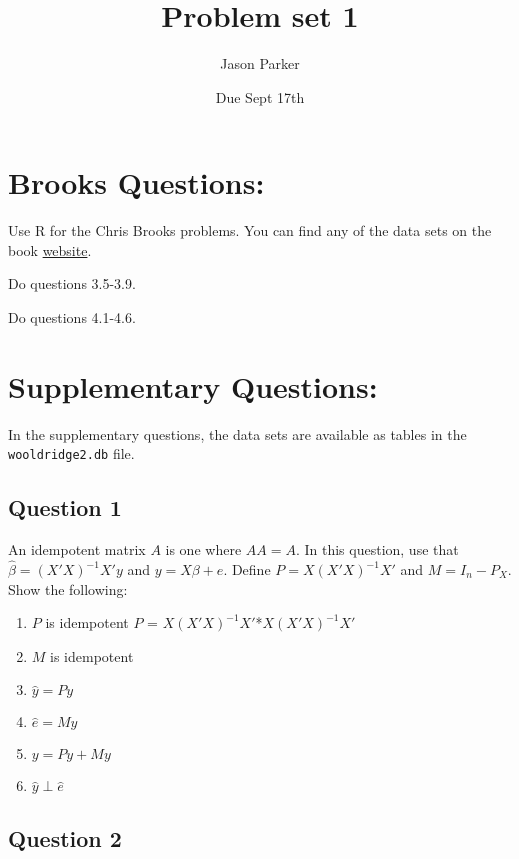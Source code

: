 \documentclass[]{article}
\title{Problem set 1}
\author{Jason Parker}
\date{Due Sept 17th}
\providecommand{\tightlist}{%
  \setlength{\itemsep}{0pt}\setlength{\parskip}{0pt}}
\begin{document}
\maketitle

\section{Brooks Questions:}\label{brooks-questions}

Use R for the Chris Brooks problems. You can find any of the data sets
on the book
\href{https://www.cambridge.org/us/academic/subjects/economics/finance/introductory-econometrics-finance-4th-edition}{website}.

Do questions 3.5-3.9.

Do questions 4.1-4.6.

\section{Supplementary Questions:}\label{supplementary-questions}

In the supplementary questions, the data sets are available as tables in
the \texttt{wooldridge2.db} file.

\subsection{Question 1}\label{question-1}

An idempotent matrix \(A\) is one where \(AA=A\). In this question, use
that \(\hat\beta=(X'X)^{-1}X'y\) and \(y=X\beta+e\). Define
\(P=X(X'X)^{-1}X'\) and \(M=I_n-P_X\). Show the following:

\begin{enumerate}
\def\labelenumi{\roman{enumi}.}
\tightlist
\item
  \(P\) is idempotent \(P\) = \(X(X'X)^{-1}X'\)*\(X(X'X)^{-1}X'\)
\item
  \(M\) is idempotent
\item
  \(\hat{y}=P y\)
\item
  \(\hat{e}=M y\)
\item
  \(y=P y+M y\)
\item
  \(\hat{y}\perp\hat{e}\)
\end{enumerate}

\subsection{Question 2}\label{question-2}
\end{document}
